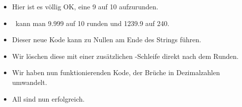 \documentclass[aspectratio=169,mathserif,notheorems]{beamer}%
\begin{document}
\begin{frame}[t]
{{\begin{itemize}
{}%
%
%
%
\item<16-> Hier ist es völlig OK, eine 9 auf 10 aufzurunden.%
%
\item<17-> \DEZB\ kann man 9.999 auf 10 runden und 1239.9 auf 240.%
%
\item<18-> Dieser neue Kode kann zu Nullen am Ende des Strings führen.%
%
\item<19-> Wir löschen diese mit einer zusätzlichen -Schleife direkt nach dem Runden.%
%
\item<20-> Wir haben nun funktionierenden Kode, der Brüche in Dezimalzahlen umwandelt.%
%
\item<21-> All  sind nun erfolgreich.%
%
\end{itemize}%
}}%
%
%
%
%
\end{frame}%
%
%
\end{document}
